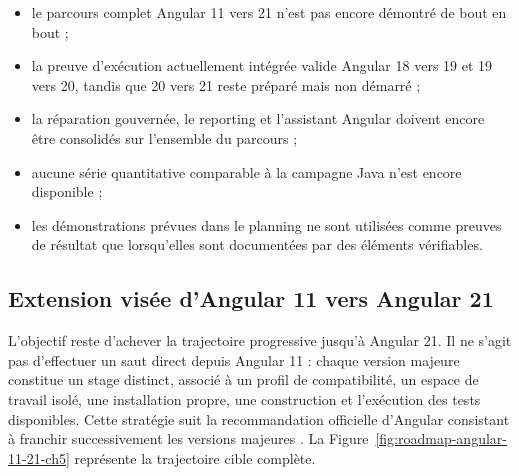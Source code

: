 \begin{itemize}
    \item le parcours complet Angular 11 vers 21 n'est pas encore démontré de bout en bout ;
    \item la preuve d'exécution actuellement intégrée valide Angular 18 vers 19 et 19 vers 20, tandis que 20 vers 21 reste préparé mais non démarré ;
    \item la réparation gouvernée, le reporting et l'assistant Angular doivent encore être consolidés sur l'ensemble du parcours ;
    \item aucune série quantitative comparable à la campagne Java n'est encore disponible ;
    \item les démonstrations prévues dans le planning ne sont utilisées comme preuves de résultat que lorsqu'elles sont documentées par des éléments vérifiables.
\end{itemize}

\subsection{Extension visée d'Angular 11 vers Angular 21}

L'objectif reste d'achever la trajectoire progressive jusqu'à Angular 21. Il ne s'agit pas d'effectuer un saut direct depuis Angular 11 : chaque version majeure constitue un stage distinct, associé à un profil de compatibilité, un espace de travail isolé, une installation propre, une construction et l'exécution des tests disponibles. Cette stratégie suit la recommandation officielle d'Angular consistant à franchir successivement les versions majeures \cite{angular-update,angular-releases}. La Figure~\ref{fig:roadmap-angular-11-21-ch5} représente la trajectoire cible complète.

